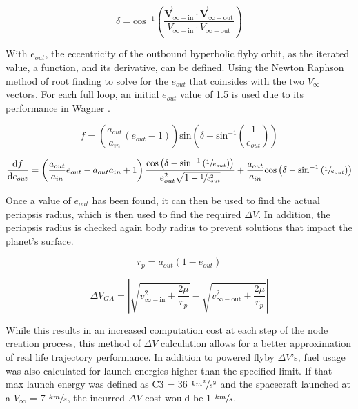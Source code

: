 \documentclass[letterpaper, preprint, paper,11pt]{AAS}	%
\begin{document}
\begin{equation}
    \delta = \text{cos}^{-1}\left(\frac{ \vec{\textbf{V}}_{\infty-\text{in}} \cdot \vec{\textbf{V}}_{\infty-\text{out}} }{ V_{\infty-\text{in}} \cdot V_{\infty-\text{out}} }\right)
\end{equation}

With $e_{out}$, the eccentricity of the outbound hyperbolic flyby orbit, as the iterated value, a function, and its derivative, can be defined. Using the Newton Raphson method of root finding to solve for the $e_{out}$ that coinsides with the two $V_\infty$ vectors. For each full loop, an initial $e_{out}$ value of 1.5 is used due to its performance in Wagner \cite{Wagner2015}.

\begin{equation}
    f = \left( \frac{a_{out}}{a_{in}} (e_{out} - 1) \right) \text{sin} \left( \delta - \text{sin}^{-1} \left( \frac{1}{e_{out}} \right) \right) 
\end{equation}

\begin{equation}
    \frac{\text{d}f}{\text{d}e_{out}} = \left( \frac{a_{out}}{a_{in}}e_{out} - a_{out}{a_{in}} + 1 \right) \frac{ \text{cos}\left( \delta - \text{sin}^{-1} \left( \sfrac{1}{e_{out}} \right) \right) }{ e_{out}^{2} \sqrt{1 - \sfrac{1}{e_{out}^{2}} } } + \frac{a_{out}}{a_{in}}\text{cos}\left( \delta - \text{sin}^{-1} \left( \sfrac{1}{e_{out}} \right) \right)
\end{equation}

Once a value of $e_{out}$ has been found, it can then be used to find the actual periapsis radius, which is then used to find the required $\Delta V$. In addition, the periapsis radius is checked again body radius to prevent solutions that impact the planet's surface. 

\begin{equation}
    r_p = a_{out}(1 - e_{out})
\end{equation}

\begin{equation}
    \Delta V_{GA} = \left| \sqrt{ v^2_{\infty-\text{in}} + \frac{2\mu}{r_p} } - \sqrt{ v^2_{\infty-\text{out}} + \frac{2\mu}{r_p} } \right|
\end{equation}

While this results in an increased computation cost at each step of the node creation process, this method of $\Delta V$ calculation allows for a better approximation of real life trajectory performance. In addition to powered flyby $\Delta V$'s, fuel usage was also calculated for launch energies higher than the specified limit. If that max launch energy was defined as C3 = 36 $\sfrac{km^2}{s^2}$ and the spacecraft launched at a $V_\infty$ = 7 $\sfrac{km}{s}$, the incurred $\Delta V$ cost would be 1 $\sfrac{km}{s}$. 
\end{document}
